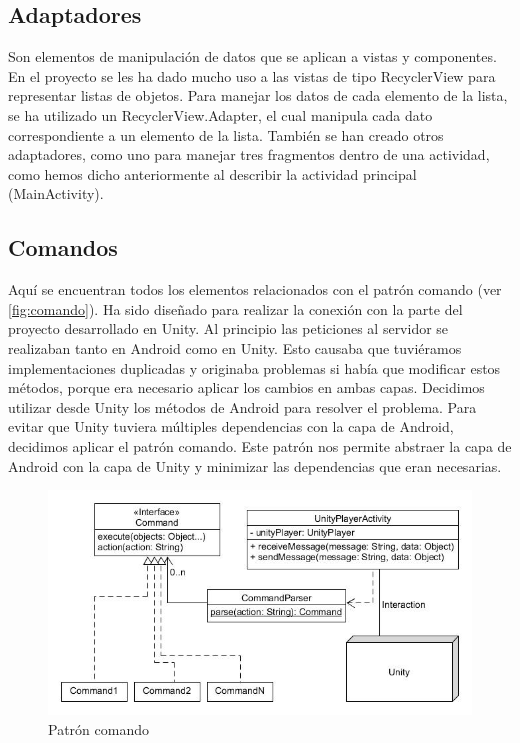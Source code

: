 \subsection{Adaptadores}
\label{makereference4.4.2} 
Son elementos de manipulación de datos que se aplican a vistas y componentes. En el proyecto se les ha dado mucho uso a las vistas de tipo RecyclerView para representar listas de objetos. Para manejar los datos de cada elemento de la lista, se ha utilizado un RecyclerView.Adapter, el cual manipula cada dato correspondiente a un elemento de la lista. También se han creado otros adaptadores, como uno para manejar tres fragmentos dentro de una actividad, como hemos dicho anteriormente al describir la actividad principal (MainActivity).

\subsection{Comandos}
\label{makereference4.4.3}
Aquí se encuentran todos los elementos relacionados con el patrón comando (ver \autoref{fig:comando}).
Ha sido diseñado para realizar la conexión con la parte del proyecto desarrollado en Unity.
Al principio las peticiones al servidor se realizaban tanto en Android como en
Unity. Esto causaba que tuviéramos implementaciones duplicadas y originaba
 problemas si había que modificar estos métodos, porque era necesario aplicar los
 cambios en ambas capas.
Decidimos utilizar desde Unity los métodos de Android para resolver el problema.
Para evitar que Unity tuviera múltiples dependencias con la capa de Android,
 decidimos aplicar el patrón comando.
Este patrón nos permite abstraer la capa de Android con la capa de Unity y
 minimizar las dependencias que eran necesarias.

\begin{figure}[H]
    \centering
    \includegraphics[width=6in]{figures/chapter-4/command.jpg}
    \caption{Patrón comando}
    \label{fig:comando}
\end{figure}



